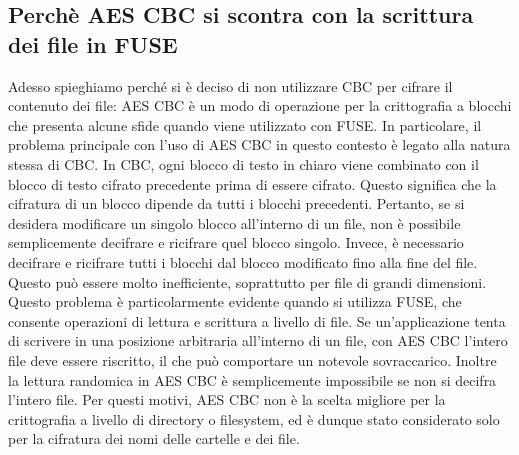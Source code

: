 \subsection{Perchè AES CBC si scontra con la scrittura dei file in FUSE}
Adesso spieghiamo perché si è deciso di non utilizzare CBC per cifrare il contenuto dei file:
AES CBC è un modo di operazione per la crittografia a blocchi che presenta alcune sfide quando viene utilizzato con FUSE. In particolare, il problema principale con l’uso di AES CBC in questo contesto è legato alla natura stessa di CBC. In CBC, ogni blocco di testo in chiaro viene combinato con il blocco di testo cifrato precedente prima di essere cifrato. Questo significa che la cifratura di un blocco dipende da tutti i blocchi precedenti. Pertanto, se si desidera modificare un singolo blocco all’interno di un file, non è possibile semplicemente decifrare e ricifrare quel blocco singolo. Invece, è necessario decifrare e ricifrare tutti i blocchi dal blocco modificato fino alla fine del file. Questo può essere molto inefficiente, soprattutto per file di grandi dimensioni.
Questo problema è particolarmente evidente quando si utilizza FUSE, che consente operazioni di lettura e scrittura a livello di file. Se un’applicazione tenta di scrivere in una posizione arbitraria all’interno di un file, con AES CBC l’intero file deve essere riscritto, il che può comportare un notevole sovraccarico. Inoltre la lettura randomica in AES CBC è semplicemente impossibile se non si decifra l'intero file.
Per questi motivi, AES CBC non è la scelta migliore per la crittografia a livello di directory o filesystem, ed è dunque stato considerato solo per la cifratura dei nomi delle cartelle e dei file.

